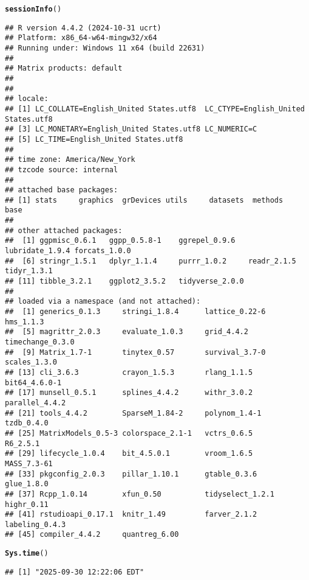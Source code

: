 \documentclass{article}\usepackage[]{graphicx}\usepackage[]{xcolor}
\makeatletter
\newcommand{\hldef}[1]{\textcolor[rgb]{0.345,0.345,0.345}{#1}}%
\newcommand{\hlkwd}[1]{\textcolor[rgb]{0.737,0.353,0.396}{\textbf{#1}}}%
\newenvironment{kframe}{%
 \def\at@end@of@kframe{}%
 \ifinner\ifhmode%
  \def\at@end@of@kframe{\end{minipage}}%
  \begin{minipage}{\columnwidth}%
 \fi\fi%
 \def\FrameCommand##1{\hskip\@totalleftmargin \hskip-\fboxsep
 \colorbox{shadecolor}{##1}\hskip-\fboxsep
     \hskip-\linewidth \hskip-\@totalleftmargin \hskip\columnwidth}%
 \MakeFramed {\advance\hsize-\width
   \@totalleftmargin\z@ \linewidth\hsize
   \@setminipage}}%
 {\par\unskip\endMakeFramed%
 \at@end@of@kframe}
\newenvironment{knitrout}{}{} %
\makeatother
\begin{document}
\begin{knitrout}
\color{fgcolor}\begin{kframe}
\begin{alltt}
\hlkwd{sessionInfo}\hldef{()}
\end{alltt}
\begin{verbatim}
## R version 4.4.2 (2024-10-31 ucrt)
## Platform: x86_64-w64-mingw32/x64
## Running under: Windows 11 x64 (build 22631)
## 
## Matrix products: default
## 
## 
## locale:
## [1] LC_COLLATE=English_United States.utf8  LC_CTYPE=English_United States.utf8   
## [3] LC_MONETARY=English_United States.utf8 LC_NUMERIC=C                          
## [5] LC_TIME=English_United States.utf8    
## 
## time zone: America/New_York
## tzcode source: internal
## 
## attached base packages:
## [1] stats     graphics  grDevices utils     datasets  methods   base     
## 
## other attached packages:
##  [1] ggpmisc_0.6.1   ggpp_0.5.8-1    ggrepel_0.9.6   lubridate_1.9.4 forcats_1.0.0  
##  [6] stringr_1.5.1   dplyr_1.1.4     purrr_1.0.2     readr_2.1.5     tidyr_1.3.1    
## [11] tibble_3.2.1    ggplot2_3.5.2   tidyverse_2.0.0
## 
## loaded via a namespace (and not attached):
##  [1] generics_0.1.3     stringi_1.8.4      lattice_0.22-6     hms_1.1.3         
##  [5] magrittr_2.0.3     evaluate_1.0.3     grid_4.4.2         timechange_0.3.0  
##  [9] Matrix_1.7-1       tinytex_0.57       survival_3.7-0     scales_1.3.0      
## [13] cli_3.6.3          crayon_1.5.3       rlang_1.1.5        bit64_4.6.0-1     
## [17] munsell_0.5.1      splines_4.4.2      withr_3.0.2        parallel_4.4.2    
## [21] tools_4.4.2        SparseM_1.84-2     polynom_1.4-1      tzdb_0.4.0        
## [25] MatrixModels_0.5-3 colorspace_2.1-1   vctrs_0.6.5        R6_2.5.1          
## [29] lifecycle_1.0.4    bit_4.5.0.1        vroom_1.6.5        MASS_7.3-61       
## [33] pkgconfig_2.0.3    pillar_1.10.1      gtable_0.3.6       glue_1.8.0        
## [37] Rcpp_1.0.14        xfun_0.50          tidyselect_1.2.1   highr_0.11        
## [41] rstudioapi_0.17.1  knitr_1.49         farver_2.1.2       labeling_0.4.3    
## [45] compiler_4.4.2     quantreg_6.00
\end{verbatim}
\begin{alltt}
\hlkwd{Sys.time}\hldef{()}
\end{alltt}
\begin{verbatim}
## [1] "2025-09-30 12:22:06 EDT"
\end{verbatim}
\end{kframe}
\end{knitrout}
\end{document}
